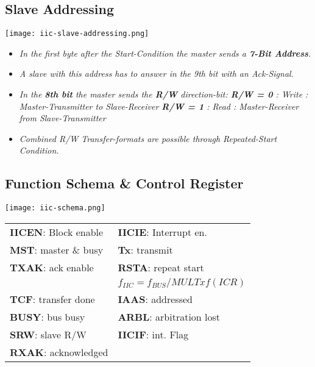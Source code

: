 \subsection{Slave Addressing}

\texttt{[image: iic-slave-addressing.png]}

\begin{itemize}
    \item{
        \textit{
            In the first byte after the Start-Condition the master sends a \textbf{7-Bit
            Address}.
        }
    }
    \item{
        \textit{
            A slave with this address has to answer in the 9th bit with an Ack-Signal.
        }
    }
    \item{
        \textit{
            In the \textbf{8th bit} the master sends the \textbf{R/W} direction-bit: \newline
            \textbf{R/W = 0} : Write : Master-Transmitter to Slave-Receiver \newline
            \textbf{R/W = 1} : Read : Master-Receiver from Slave-Transmitter
        }
    }
    \item{
        \textit{
            Combined R/W Transfer-formats are possible through Repeated-Start
            Condition.
        }
    }
\end{itemize}

\subsection{Function Schema \& Control Register}

\texttt{[image: iic-schema.png]}

\begin{tabular}{ll}
    \textbf{IICEN}: Block enable & \textbf{IICIE}: Interrupt en. \\
    \textbf{MST}: master \& busy & \textbf{Tx}: transmit \\
    \textbf{TXAK}: ack enable    & \textbf{RSTA}: repeat start \\
                                 & $f_{IIC} = f_{BUS} / MULTxf(ICR)$ \\
    \textbf{TCF}: transfer done  & \textbf{IAAS}: addressed \\
    \textbf{BUSY}: bus busy      & \textbf{ARBL}: arbitration lost \\
    \textbf{SRW}: slave R/W      & \textbf{IICIF}: int. Flag \\
    \textbf{RXAK}: acknowledged  & \\
\end{tabular}

